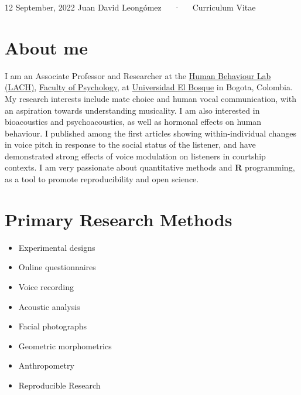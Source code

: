 \documentclass[11pt,a4paper,]{awesome-cv}
\begin{document}
\makecvheader

\makecvfooter
  {12 September, 2022}
    {Juan David Leongómez~~~·~~~Curriculum Vitae}
  {\thepage}





\hypertarget{about-me}{%
\section{About me}\label{about-me}}

I am an Associate Professor and Researcher at the
\href{https://www.psicologia.unbosque.edu.co/lach}{Human Behaviour Lab
(LACH)}, \href{https://www.uelbosque.edu.co/psicologia}{Faculty of
Psychology}, at \href{https://www.uelbosque.edu.co/}{Universidad El
Bosque} in Bogota, Colombia. My research interests include mate choice
and human vocal communication, with an aspiration towards understanding
musicality. I am also interested in bioacoustics and psychoacoustics, as
well as hormonal effects on human behaviour. I published among the first
articles showing within-individual changes in voice pitch in response to
the social status of the listener, and have demonstrated strong effects
of voice modulation on listeners in courtship contexts. I am very
passionate about quantitative methods and \textbf{R} programming, as a
tool to promote reproducibility and open science.

\hypertarget{primary-research-methods}{%
\section{Primary Research Methods}\label{primary-research-methods}}

\begin{multicols}{2}
\begin{itemize}
 \item Experimental designs
 \item Online questionnaires 
 \item Voice recording
 \item Acoustic analysis
 \item Facial photographs
 \item Geometric morphometrics
 \item Anthropometry
 \item Reproducible Research
\end{itemize}
\end{multicols}
\end{document}
